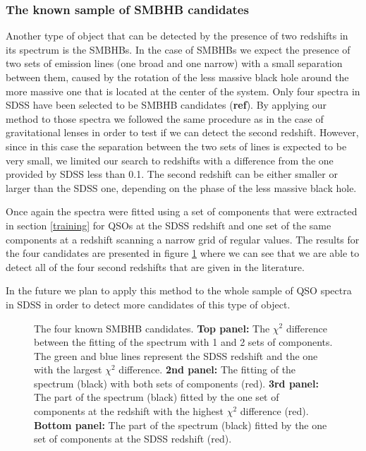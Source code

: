 \documentclass[12pt,preprint]{aastex}
\begin{document}
\subsubsection{The known sample of SMBHB candidates}\label{smbhb}
Another type of object that can be detected by the presence of two redshifts in its spectrum is the SMBHBs. In the case of SMBHBs we expect the presence of two sets of emission lines (one broad and one narrow) with a small separation between them, caused by the rotation of the less massive black hole around the more massive one that is located at the center of the system. Only four spectra in SDSS have been selected to be SMBHB candidates (\textbf{ref}). By applying our method to those spectra we followed the same procedure as in the case of gravitational lenses in order to test if we can detect the second redshift. However, since in this case the separation between the two sets of lines is expected to be very small, we limited our search to redshifts with a difference from the one provided by SDSS less than 0.1. The second redshift can be either smaller or larger than the SDSS one, depending on the phase of the less massive black hole.

Once again the spectra were fitted using a set of components that were extracted in section \ref{training} for QSOs at the SDSS redshift and one set of the same components at a redshift scanning a narrow grid of regular values. The results for the four candidates are presented in figure \ref{f6a} where we can see that we are able to detect all of the four second redshifts that are given in the literature.

In the future we plan to apply this method to the whole sample of QSO spectra in SDSS in order to detect more candidates of this type of object.

\begin{figure}[h]
\caption{The four known SMBHB candidates. \textbf{Top panel:} The $\chi^2$ difference between the fitting of the spectrum with 1 and 2 sets of components. The green and blue lines represent the SDSS redshift and the one with the largest $\chi^2$ difference. \textbf{2nd panel:} The fitting of the spectrum (black) with both sets of components (red). \textbf{3rd panel:} The part of the spectrum (black) fitted by the one set of components at the redshift with the highest $\chi^2$ difference (red). \textbf{Bottom panel:} The part of the spectrum (black) fitted by the one set of components at the SDSS redshift (red).}
\label{f6a}
\end{figure}
\end{document}
